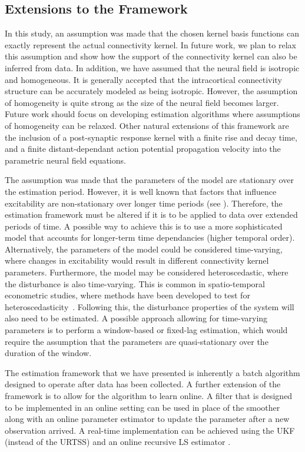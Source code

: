 \documentclass[review,authoryear,3p]{elsarticle}
\begin{document}
\subsection{Extensions to the Framework}
In this study, an assumption was made that the chosen kernel basis functions can exactly represent the actual connectivity kernel. In future work, we plan to relax this assumption and show how the support of the connectivity kernel can also be inferred from data. In addition, we have assumed that the neural field is isotropic and homogeneous. It is generally accepted that the intracortical connectivity structure can be accurately modeled as being isotropic. However, the assumption of homogeneity is quite strong as the size of the neural field becomes larger. Future work should focus on developing estimation algorithms where assumptions of homogeneity can be relaxed. Other natural extensions of this framework are the inclusion of a post-synaptic response kernel with a finite rise and decay time, and a finite distant-dependant action potential propagation velocity into the parametric neural field equations. 

The assumption was made that the parameters of the model are stationary over the estimation period. However, it is well known that factors that influence excitability are non-stationary over longer time periods (see \citet{Ullah2010}). Therefore, the estimation framework must be altered if it is to be applied to data over extended periods of time. A possible way to achieve this is to use a more sophisticated model that accounts for longer-term time dependancies (higher temporal order). Alternatively, the parameters of the model could be considered time-varying, where changes in excitability would result in different connectivity kernel parameters. Furthermore, the model may be considered heteroscedastic, where the disturbance is also time-varying. This is common in spatio-temporal econometric studies, where methods have been developed to test for heteroscedasticity~\citep{Anselin1988}. Following this, the disturbance properties of the system will also need to be estimated. A possible approach allowing for time-varying parameters is to perform a window-based or fixed-lag estimation, which would require the assumption that the parameters are quasi-stationary over the duration of the window.

The estimation framework that we have presented is inherently a batch algorithm designed to operate after data has been collected. A further extension of the framework is to allow for the algorithm to learn online. A filter that is designed to be implemented in an online setting can be used in place of the smoother along with an online parameter estimator to update the parameter after a new observation arrived. A real-time implementation can be achieved using the UKF (instead of the URTSS) and an online recursive LS estimator \cite{Ljung1999}.
\end{document}
